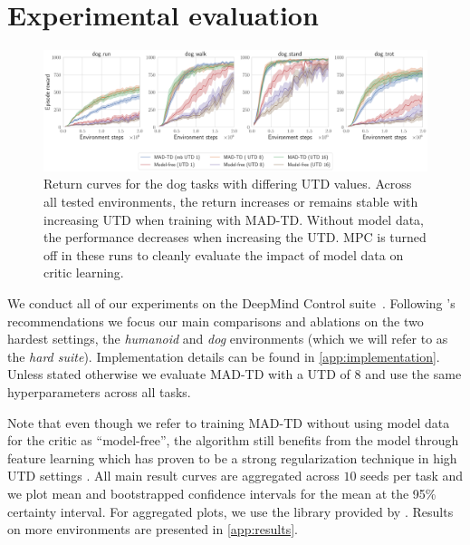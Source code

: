 
\section{Experimental evaluation}

\begin{figure}[t]
    \centering
    \includegraphics[width=1.0\linewidth]{figures/mad-td/dog_utd_comp.pdf}
    \caption{Return curves for the dog tasks with differing UTD values. Across all tested environments, the return increases or remains stable with increasing UTD when training with MAD-TD. Without model data, the performance decreases when increasing the UTD. MPC is turned off in these runs to cleanly evaluate the impact of model data on critic learning.}
    \label{fig:main_dog}
\end{figure}


We conduct all of our experiments on the DeepMind Control suite~\parencite{tunyasuvunakool2020dmcontrol}. Following \textcite{nauman2024bigger}'s recommendations we focus our main comparisons and ablations on the two hardest settings, the \emph{humanoid} and \emph{dog} environments (which we will refer to as the \emph{hard suite}).
Implementation details can be found in \autoref{app:implementation}.
Unless stated otherwise we evaluate MAD-TD with a UTD of 8 and use the same hyperparameters across all tasks.

Note that even though we refer to training MAD-TD without using model data for the critic as ``model-free'', the algorithm still benefits from the model through feature learning which has proven to be a strong regularization technique in high UTD settings \parencite{schwarzer2023bigger}.
All main result curves are aggregated across $10$ seeds per task and we plot mean and bootstrapped confidence intervals for the mean at the 95\% certainty interval.
For aggregated plots, we use the library provided by \textcite{agarwal2021deep}.
Results on more environments are presented in \autoref{app:results}.

